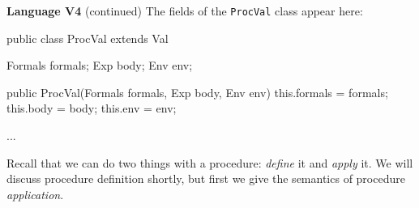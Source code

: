 \begin{minipage}[t]{\sw}
\slidenumber
\LARGE
{\bf Language V4} (continued)\exx
The fields of the \verb'ProcVal' class appear here:
\Large
\begin{qv}
public class ProcVal extends Val {

    Formals formals;
    Exp body;
    Env env;

    public ProcVal(Formals formals, Exp body, Env env) {
        this.formals = formals;
        this.body = body;
        this.env = env;
    }

    ...
}
\end{qv}
\LARGE
Recall that we can do two things with a procedure:
{\em define} it and {\em apply} it.
We will discuss procedure definition shortly,
but first we give the semantics of procedure {\em application}.
\end{minipage}
